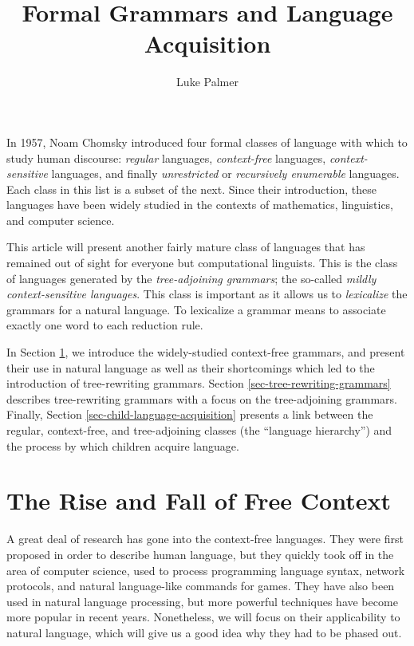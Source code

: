 \documentclass[12pt]{article}
\title{Formal Grammars and Language Acquisition}
\author{Luke Palmer}
\newcommand{\defn}[1]{\textit{#1}}
\begin{document}
\maketitle
\doublespace

In 1957, Noam Chomsky introduced four formal classes of language with
which to study human discourse:  \defn{regular} languages,
\defn{context-free} languages, \defn{context-sensitive} languages, and
finally \defn{unrestricted} or \defn{recursively enumerable} languages.
Each class in this list is a subset of the next.  Since their
introduction, these languages have been widely studied in the contexts
of mathematics, linguistics, and computer science.

This article will present another fairly mature class of languages that
has remained out of sight for everyone but computational linguists.
This is the class of languages generated by the \defn{tree-adjoining
grammars}; the so-called \defn{mildly context-sensitive languages}.
This class is important as it allows us to \defn{lexicalize} the
grammars for a natural language.  To lexicalize a grammar means to
associate exactly one word to each reduction rule.

In Section \ref{sec-free-context}, we introduce the widely-studied
context-free grammars, and present their use in natural language as well
as their shortcomings which led to the introduction of tree-rewriting
grammars.  Section \ref{sec-tree-rewriting-grammars} describes
tree-rewriting grammars with a focus on the tree-adjoining grammars.
Finally, Section \ref{sec-child-language-acquisition} presents a link
between the regular, context-free, and tree-adjoining classes (the
``language hierarchy'') and the process by which children acquire
language.

\section{The Rise and Fall of Free Context}
\label{sec-free-context}

A great deal of research has gone into the context-free languages.  They
were first proposed in order to describe human language, but they
quickly took off in the area of computer science, used to process
programming language syntax, network protocols, and natural
language-like commands for games.  They have also been used in natural
language processing, but more powerful techniques have become more
popular in recent years.  Nonetheless, we will focus on their
applicability to natural language, which will give us a good idea why
they had to be phased out.
\end{document}
